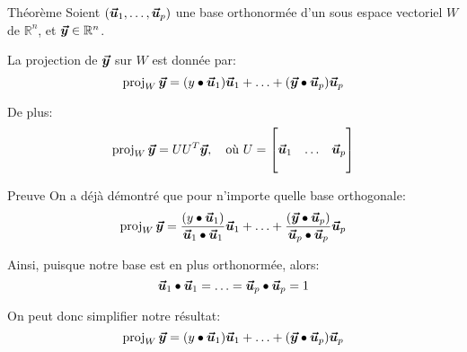 \documentclass[a4paper]{article}
\begin{document}
\begin{parag}{Théorème}
    Soient $\left(\bvec{u}_1, \ldots, \bvec{u}_p\right)$ une base orthonormée d'un sous espace vectoriel $W$ de $\mathbb{R}^n$, et $\bm{\protect\vec{y}} \in \mathbb{R}^n$.

    La projection de $\bm{\protect\vec{y}}$ sur $W$ est donnée par:
    \[\proj_W \bvec{y} = \left(y \dotprod \bvec{u}_1\right) \bvec{u}_1 + \ldots + \left(\bvec{y} \dotprod \bvec{u}_p\right)\bvec{u}_p\]

    De plus:
    \[\operatorname{proj}_W \bm{\protect\vec{y}} = U U^T \bm{\protect\vec{y}}, \quad \text{où } U = \begin{bmatrix}  &  &  \\ \bm{\protect\vec{u}}_1 & \ldots & \bm{\protect\vec{u}}_p \\  &  &  \end{bmatrix} \]


    \begin{subparag}{Preuve}
        On a déjà démontré que pour n'importe quelle base orthogonale:
        \[\proj_W \bvec{y} = \frac{\left(y \dotprod \bvec{u}_1\right)}{\bvec{u}_1 \dotprod \bvec{u}_1} \bvec{u}_1 + \ldots + \frac{\left(\bvec{y} \dotprod \bvec{u}_p\right)}{\bvec{u}_p \dotprod \bvec{u}_p}\bvec{u}_p\]

        Ainsi, puisque notre base est en plus orthonormée, alors:
        \[\bm{\protect\vec{u}}_1 \bullet \bm{\protect\vec{u}}_1 = \ldots = \bm{\protect\vec{u}}_p \bullet \bm{\protect\vec{u}}_p = 1\]

        On peut donc simplifier notre résultat:
        \[\proj_W \bvec{y} = \left(y \dotprod \bvec{u}_1\right) \bvec{u}_1 + \ldots + \left(\bvec{y} \dotprod \bvec{u}_p\right)\bvec{u}_p\]


\end{subparag}
\end{parag}
\end{document}
